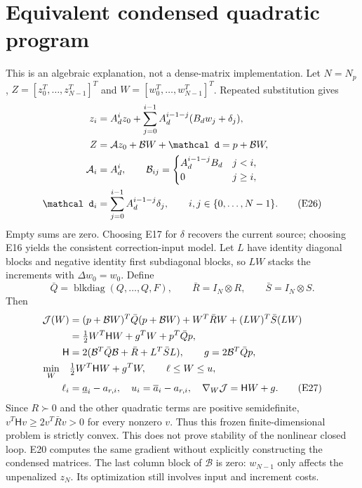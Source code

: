 \documentclass[11pt,a4paper]{article}
\begin{document}
\section{Equivalent condensed quadratic program}
This is an algebraic explanation, not a dense-matrix implementation.
Let $N=N_p$, $Z=[z_0^T,\ldots,z_{N-1}^T]^T$ and
$W=[w_0^T,\ldots,w_{N-1}^T]^T$. Repeated substitution gives
\begin{align}
z_i&=A_d^iz_0+\sum_{j=0}^{i-1}A_d^{i-1-j}(B_dw_j+\delta_j),\notag\\
Z&=\mathcal A z_0+\mathcal BW+\mathcal d=p+\mathcal BW,\notag\\
\mathcal A_i&=A_d^i,\qquad
\mathcal B_{ij}=\begin{cases}A_d^{i-1-j}B_d&j<i,\\0&j\ge i,\end{cases}\notag\\
\mathcal d_i&=\sum_{j=0}^{i-1}A_d^{i-1-j}\delta_j,
\qquad i,j\in\{0,\ldots,N-1\}.\tag{E26}
\end{align}
Empty sums are zero. Choosing E17 for $\delta$ recovers the current source;
choosing E16 yields the consistent correction-input model.
Let $L$ have identity diagonal blocks and negative identity first
subdiagonal blocks, so $LW$ stacks the increments with $\Delta w_0=w_0$.
Define
\[
\bar Q=\operatorname{blkdiag}(Q,\ldots,Q,F),\qquad
\bar R=I_N\otimes R,\qquad \bar S=I_N\otimes S.
\]
Then
\begin{align}
\mathcal J(W)&=(p+\mathcal BW)^T\bar Q(p+\mathcal BW)
 +W^T\bar RW+(LW)^T\bar S(LW)\notag\\
&=\tfrac12W^T\mathsf HW+g^TW+p^T\bar Qp,\notag\\
\mathsf H&=2(\mathcal B^T\bar Q\mathcal B+\bar R+L^T\bar SL),\qquad
g=2\mathcal B^T\bar Qp,\notag\\
\min_W\quad&\tfrac12W^T\mathsf HW+g^TW,\qquad \ell\le W\le u,\notag\\
\ell_i&=\underline a_i-a_{r,i},\quad u_i=\overline a_i-a_{r,i},\quad
\nabla_W\mathcal J=\mathsf HW+g.\tag{E27}
\end{align}
Since $R\succ0$ and the other quadratic terms are positive semidefinite,
$v^T\mathsf Hv\ge2v^T\bar Rv>0$ for every nonzero $v$.
Thus this frozen finite-dimensional problem is strictly convex. This does
not prove stability of the nonlinear closed loop. E20 computes the same
gradient without explicitly constructing the condensed matrices.
The last column block of $\mathcal B$ is zero: $w_{N-1}$ only affects the
unpenalized $z_N$. Its optimization still involves input and increment costs.
\end{document}
